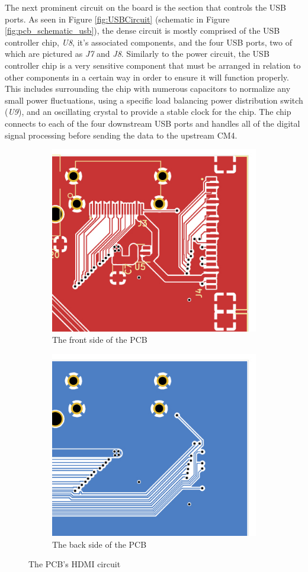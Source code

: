 The next prominent circuit on the board is the section that controls the USB ports.
As seen in Figure \ref{fig:USBCircuit} (schematic in Figure \ref{fig:pcb_schematic_usb}), the dense circuit is mostly comprised of the USB controller chip, \emph{U8}, it's associated components, and the four USB ports, two of which are pictured as \emph{J7} and \emph{J8}.
Similarly to the power circuit, the USB controller chip is a very sensitive component that must be arranged in relation to other components in a certain way in order to ensure it will function properly.
This includes surrounding the chip with numerous capacitors to normalize any small power fluctuations, using a specific load balancing power distribution switch (\emph{U9}), and an oscillating crystal to provide a stable clock for the chip.
The chip connects to each of the four downstream USB ports and handles all of the digital signal processing before sending the data to the upstream CM4.

\begin{figure}[b]
  \centering
  \begin{subfigure}{.5\textwidth}
    \centering
    \includegraphics[width=.6\linewidth]{Figures/kicad/close-ups/hdmi-front}
    \caption{The front side of the PCB}
    \label{fig:HDMICircuitFront}
  \end{subfigure}%
  \begin{subfigure}{.5\textwidth}
    \centering
    \includegraphics[width=.6\linewidth]{Figures/kicad/close-ups/hdmi-back}
    \caption{The back side of the PCB}
    \label{fig:HDMICircuitBack}
  \end{subfigure}
  \caption{The PCB's HDMI circuit}
  \label{fig:HDMICircuit}
\end{figure}


